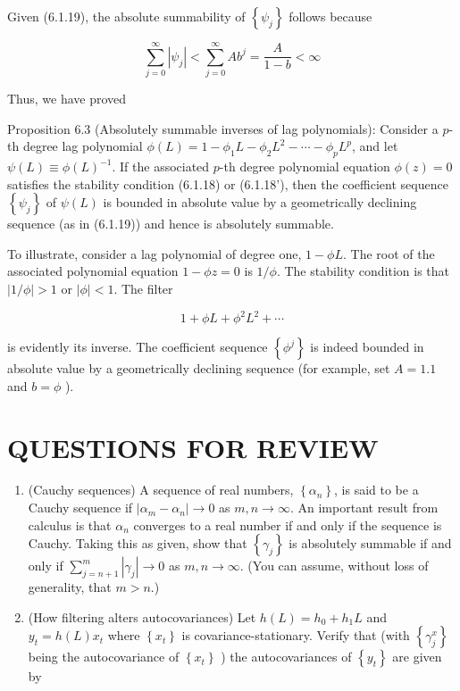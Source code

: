 \documentclass[10pt]{article}
\begin{document}
Given (6.1.19), the absolute summability of $\left\{\psi_{j}\right\}$ follows because

$$
\sum_{j=0}^{\infty}\left|\psi_{j}\right|<\sum_{j=0}^{\infty} A b^{j}=\frac{A}{1-b}<\infty
$$

Thus, we have proved

Proposition 6.3 (Absolutely summable inverses of lag polynomials): Consider a $p$-th degree lag polynomial $\phi(L)=1-\phi_{1} L-\phi_{2} L^{2}-\cdots-\phi_{p} L^{p}$, and let $\psi(L) \equiv \phi(L)^{-1}$. If the associated $p$-th degree polynomial equation $\phi(z)=0$ satisfies the stability condition (6.1.18) or (6.1.18'), then the coefficient sequence $\left\{\psi_{j}\right\}$ of $\psi(L)$ is bounded in absolute value by a geometrically declining sequence (as in (6.1.19)) and hence is absolutely summable.

To illustrate, consider a lag polynomial of degree one, $1-\phi L$. The root of the associated polynomial equation $1-\phi z=0$ is $1 / \phi$. The stability condition is that $|1 / \phi|>1$ or $|\phi|<1$. The filter


\begin{equation*}
1+\phi L+\phi^{2} L^{2}+\cdots \tag{6.1.20}
\end{equation*}


is evidently its inverse. The coefficient sequence $\left\{\phi^{j}\right\}$ is indeed bounded in absolute value by a geometrically declining sequence (for example, set $A=1.1$ and $b=\phi$ ).

\section*{QUESTIONS FOR REVIEW}
\begin{enumerate}
  \item (Cauchy sequences) A sequence of real numbers, $\left\{\alpha_{n}\right\}$, is said to be a Cauchy sequence if $\left|\alpha_{m}-\alpha_{n}\right| \rightarrow 0$ as $m, n \rightarrow \infty$. An important result from calculus is that $\alpha_{n}$ converges to a real number if and only if the sequence is Cauchy. Taking this as given, show that $\left\{\gamma_{j}\right\}$ is absolutely summable if and only if $\sum_{j=n+1}^{m}\left|\gamma_{j}\right| \rightarrow 0$ as $m, n \rightarrow \infty$. (You can assume, without loss of generality, that $m>n$.)
  \item (How filtering alters autocovariances) Let $h(L)=h_{0}+h_{1} L$ and $y_{t}=h(L) x_{t}$ where $\left\{x_{t}\right\}$ is covariance-stationary. Verify that (with $\left\{\gamma_{j}^{x}\right\}$ being the autocovariance of $\left\{x_{t}\right\}$ ) the autocovariances of $\left\{y_{t}\right\}$ are given by
\end{enumerate}
\end{document}
